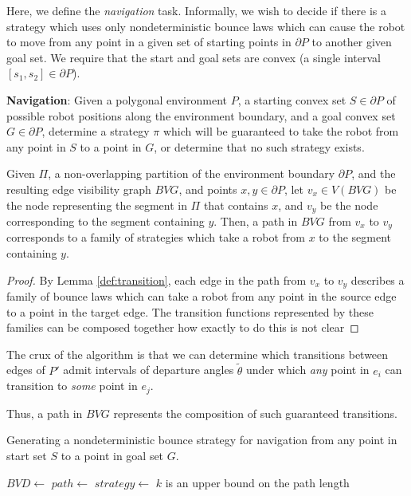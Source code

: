 \documentclass[]{svproc}  %
\begin{document}
Here, we define the \emph{navigation} task. Informally, we wish to decide if
there is a strategy which uses only nondeterministic bounce laws which can cause
the robot to move from any point in a given set of starting points in $\partial P$ to
another given goal set. We require that the start and goal sets are
convex (a single interval $[s_1, s_2] \in \partial P$).


\begin{definition}
\textbf{Navigation}:
Given a polygonal environment $P$, a starting convex set $S \in \partial P$ of possible robot positions along the
environment boundary, and a goal convex set $G \in \partial P$, determine a strategy $\pi$ which
will be guaranteed to take the robot from any point in $S$ to a point in $G$, or
determine that no such strategy exists.
\end{definition}

\begin{lemma}
Given $\Pi$, a non-overlapping partition of the environment boundary $\partial P$, and the resulting edge visibility graph
$BVG$, and points $x,y \in \partial P$, let $v_x \in V(BVG)$ be the node representing
the segment in $\Pi$ that contains $x$, and $v_y$ be the node corresponding to
the segment containing $y$. Then, a path in $BVG$ from $v_x$ to $v_y$ corresponds
to a family of strategies which take a robot from $x$ to the segment containing
$y$.
\end{lemma}

\begin{proof}
By Lemma \ref{def:transition}, each edge in the path from $v_x$ to $v_y$
describes a family of bounce laws which can take a robot from any point in the
source edge to a point in the target edge. The transition functions represented
by these families can be composed together {\color{red} how exactly to do this
is not clear}
\end{proof}


The crux of the algorithm is that we can determine which transitions between
edges of $P'$ admit intervals of departure angles $\tilde{\theta}$ under which
\emph{any} point in $e_i$ can transition to \emph{some} point in $e_j$.

Thus, a path in $BVG$ represents the composition of such guaranteed transitions.

\begin{algorithm}
\caption{Generating a nondeterministic bounce strategy for navigation from any
point in start set $S$ to a point in goal set $G$.}
\label{algo:nav}

\begin{algorithmic}
\State $BVD \gets$ 
\State $path \gets$ 
\State $strategy \gets$ 
\Comment $k$ is an upper bound on the path length
\EndProcedure
\end{algorithmic}
\end{algorithm}
\end{document}
